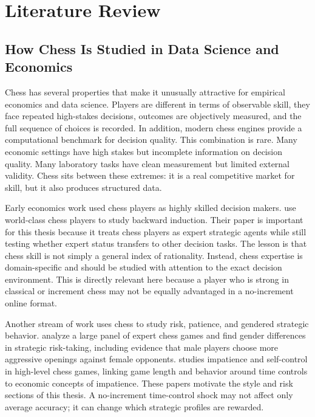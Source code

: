 \section{Literature Review}

\subsection{How Chess Is Studied in Data Science and Economics}

Chess has several properties that make it unusually attractive for empirical economics and data science. Players are different in terms of observable skill, they face repeated high-stakes decisions, outcomes are objectively measured, and the full sequence of choices is recorded. In addition, modern chess engines provide a computational benchmark for decision quality. This combination is rare. Many economic settings have high stakes but incomplete information on decision quality. Many laboratory tasks have clean measurement but limited external validity. Chess sits between these extremes: it is a real competitive market for skill, but it also produces structured data.

Early economics work used chess players as highly skilled decision makers. \citet{levitt2011checkmate} use world-class chess players to study backward induction. Their paper is important for this thesis because it treats chess players as expert strategic agents while still testing whether expert status transfers to other decision tasks. The lesson is that chess skill is not simply a general index of rationality. Instead, chess expertise is domain-specific and should be studied with attention to the exact decision environment. This is directly relevant here because a player who is strong in classical or increment chess may not be equally advantaged in a no-increment online format.

Another stream of work uses chess to study risk, patience, and gendered strategic behavior. \citet{gerdes2010strategic} analyze a large panel of expert chess games and find gender differences in strategic risk-taking, including evidence that male players choose more aggressive openings against female opponents. \citet{gransmark2012masters} studies impatience and self-control in high-level chess games, linking game length and behavior around time controls to economic concepts of impatience. These papers motivate the style and risk sections of this thesis. A no-increment time-control shock may not affect only average accuracy; it can change which strategic profiles are rewarded.

